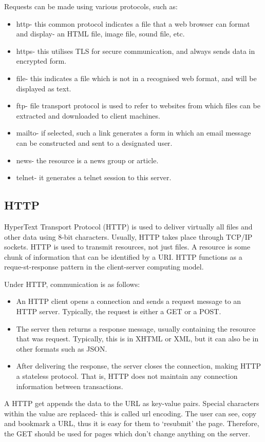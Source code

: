 \documentclass[a4paper, openany]{memoir}
\begin{document}
\noindent Requests can be made using various protocols, such as:
\begin{itemize}
    \item http- this common protocol indicates a file that a web browser can format and display- an HTML file, image file, sound file, etc.
    \item https- this utilises TLS for secure communication, and always sends data in encrypted form.
    \item file- this indicates a file which is not in a recognised web format, and will be displayed as text.
    \item ftp- file transport protocol is used to refer to websites from which files can be extracted and downloaded to client machines.
    \item mailto- if selected, such a link generates a form in which an email message can be constructed and sent to a designated user.
    \item news- the resource is a news group or article.
    \item telnet- it generates a telnet session to this server.
\end{itemize}

\subsection{HTTP}
HyperText Transport Protocol (HTTP) is used to deliver virtually all files and other data using 8-bit characters. Usually, HTTP takes place through TCP/IP sockets. HTTP is used to transmit resources, not just files. A resource is some chunk of information that can be identified by a URI. HTTP functions as a reque-st-response pattern in the client-server computing model.

\noindent Under HTTP, communication is as follows:
\begin{itemize}
    \item An HTTP client opens a connection and sends a request message to an HTTP server. Typically, the request is either a GET or a POST.
    \item The server then returns a response message, usually containing the resource that was request. Typically, this is in XHTML or XML, but it can also be in other formats such as JSON.
    \item After delivering the response, the server closes the connection, making HTTP a stateless protocol. That is, HTTP does not maintain any connection information between transactions.
\end{itemize}
A HTTP get appends the data to the URL as key-value pairs. Special characters within the value are replaced- this is called url encoding. The user can see, copy and bookmark a URL, thus it is easy for them to `resubmit' the page. Therefore, the GET should be used for pages which don't change anything on the server.
\end{document}

